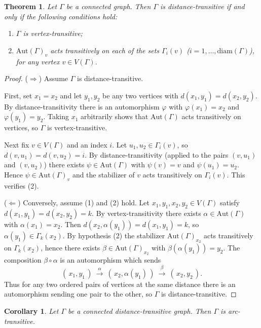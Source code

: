 \documentclass[12pt,a4paper,openany]{book}
\newtheorem{theorem}{Theorem}[section]
\newtheorem{corollary}{Corollary}[section]
\begin{document}
\begin{theorem}
Let $\Gamma$ be a connected graph. Then $\Gamma$ is distance-transitive if and only if the following conditions hold:
\begin{enumerate}
    \item $\Gamma$ is vertex-transitive;
    \item $\text{Aut}(\Gamma)_v$ acts transitively on each of the sets $\Gamma_i(v)$ ($i = 1, \dots, \text{diam}(\Gamma)$), for any vertex $v \in V(\Gamma)$.
\end{enumerate}
\end{theorem}

\begin{proof}
($\Rightarrow$) Assume $\Gamma$ is distance-transitive.  

First, set $x_1=x_2$ and let $y_1,y_2$ be any two vertices with
$d(x_1,y_1)=d(x_2,y_2)$. By distance-transitivity there is an automorphism
$\varphi$ with $\varphi(x_1)=x_2$ and $\varphi(y_1)=y_2$. Taking $x_1$
arbitrarily shows that $\mathrm{Aut}(\Gamma)$ acts transitively on
vertices, so $\Gamma$ is vertex-transitive.

Next fix $v\in V(\Gamma)$ and an index $i$. Let $u_1,u_2\in\Gamma_i(v)$,
so $d(v,u_1)=d(v,u_2)=i$. By distance-transitivity (applied to the pairs
$(v,u_1)$ and $(v,u_2)$) there exists $\psi\in\mathrm{Aut}(\Gamma)$ with
$\psi(v)=v$ and $\psi(u_1)=u_2$. Hence $\psi\in\mathrm{Aut}(\Gamma)_v$
and the stabilizer of $v$ acts transitively on $\Gamma_i(v)$. This
verifies (2).

($\Leftarrow$) Conversely, assume (1) and (2) hold. Let
$x_1,y_1,x_2,y_2\in V(\Gamma)$ satisfy
$d(x_1,y_1)=d(x_2,y_2)=k$. By vertex-transitivity there exists
$\alpha\in\mathrm{Aut}(\Gamma)$ with $\alpha(x_1)=x_2$. Then
$d(x_2,\alpha(y_1))=d(x_1,y_1)=k$, so $\alpha(y_1)\in\Gamma_k(x_2)$.
By hypothesis (2) the stabilizer $\mathrm{Aut}(\Gamma)_{x_2}$ acts
transitively on $\Gamma_k(x_2)$, hence there exists
$\beta\in\mathrm{Aut}(\Gamma)_{x_2}$ with
$\beta(\alpha(y_1))=y_2$. The composition $\beta\circ\alpha$ is an
automorphism which sends
\[
(\,x_1,y_1\,)\ \xrightarrow{\ \alpha\ }\ (\,x_2,\alpha(y_1)\,)\ 
\xrightarrow{\ \beta\ }\ (\,x_2,y_2\,).
\]
Thus for any two ordered pairs of vertices at the same distance there is
an automorphism sending one pair to the other, so $\Gamma$ is
distance-transitive.
\end{proof}

\begin{corollary}
Let $\Gamma$ be a connected distance-transitive graph. Then $\Gamma$ is arc-transitive.
\end{corollary}
\end{document}
